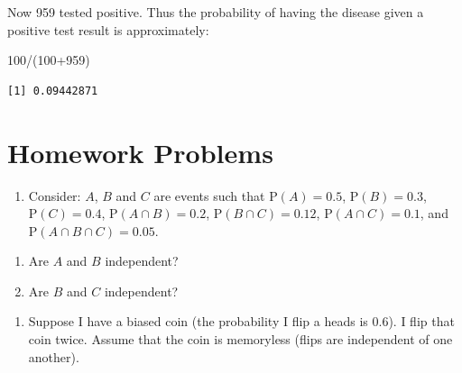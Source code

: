 \documentclass[
  letterpaper,
  DIV=11,
  numbers=noendperiod]{scrreprt}
\newenvironment{Shaded}{\begin{snugshade}}{\end{snugshade}}
\newcommand{\DecValTok}[1]{\textcolor[rgb]{0.68,0.00,0.00}{#1}}
\newcommand{\NormalTok}[1]{\textcolor[rgb]{0.00,0.23,0.31}{#1}}
\newcommand{\SpecialCharTok}[1]{\textcolor[rgb]{0.37,0.37,0.37}{#1}}
\providecommand{\tightlist}{%
  \setlength{\itemsep}{0pt}\setlength{\parskip}{0pt}}\usepackage{longtable,booktabs,array}
\begin{document}
Now 959 tested positive. Thus the probability of having the disease
given a positive test result is approximately:

\begin{Shaded}
\begin{Highlighting}[]
\DecValTok{100}\SpecialCharTok{/}\NormalTok{(}\DecValTok{100}\SpecialCharTok{+}\DecValTok{959}\NormalTok{)}
\end{Highlighting}
\end{Shaded}

\begin{verbatim}
[1] 0.09442871
\end{verbatim}

\section{Homework Problems}\label{homework-problems-8}

\begin{enumerate}
\def\labelenumi{\arabic{enumi}.}
\tightlist
\item
  Consider: \(A\), \(B\) and \(C\) are events such that
  \(\mbox{P}(A)=0.5\), \(\mbox{P}(B)=0.3\), \(\mbox{P}(C)=0.4\),
  \(\mbox{P}(A \cap B)=0.2\), \(\mbox{P}(B \cap C)=0.12\),
  \(\mbox{P}(A \cap C)=0.1\), and \(\mbox{P}(A \cap B \cap C)=0.05\).
\end{enumerate}

\begin{enumerate}
\def\labelenumi{\alph{enumi}.}
\tightlist
\item
  Are \(A\) and \(B\) independent?\\
\item
  Are \(B\) and \(C\) independent?
\end{enumerate}

\begin{enumerate}
\def\labelenumi{\arabic{enumi}.}
\setcounter{enumi}{1}
\tightlist
\item
  Suppose I have a biased coin (the probability I flip a heads is 0.6).
  I flip that coin twice. Assume that the coin is memoryless (flips are
  independent of one another).
\end{enumerate}
\end{document}
